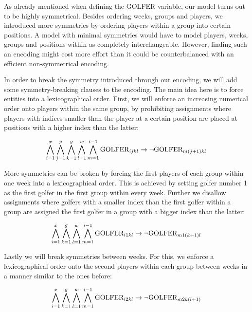 \documentclass[a4paper]{scrartcl}
\begin{document}
As already mentioned when defining the GOLFER variable, our model turns out to be highly symmetrical. Besides ordering weeks, groups and players, we introduced more symmetries by ordering players within a group into certain positions. A model with minimal symmetries would have to model players, weeks, groups and positions within as completely interchangeable. However, finding such an encoding might cost more effort than it could be counterbalanced with an efficient non-symmetrical encoding. 

In order to break the symmetry introduced through our encoding, we will add some symmetry-breaking clauses to the encoding. The main idea here is to force entities into a lexicographical order. First, we will enforce an increasing numerical order onto players within the same group, by prohibiting assignments where players with indices smaller than the player at a certain position are placed at positions with a higher index than the latter:

\begin{equation}
\centering
    \bigwedge \limits_{i=1}^x
    \bigwedge \limits_{j=1}^p
    \bigwedge \limits_{k=1}^g
    \bigwedge \limits_{l=1}^w
    \bigwedge \limits_{m=1}^{i-1}
    \text{GOLFER}_{ijkl}
    \to
    \neg \text{GOLFER}_{m(j+1)kl}
\end{equation}

More symmetries can be broken by forcing the first players of each group within one week into a lexicographical order. This is achieved by setting golfer number 1 as the first golfer in the first group within every week. Further we disallow assignments where golfers with a smaller index than the first golfer within a group are assigned the first golfer in a group with a bigger index than the latter:

\begin{equation}
\centering
    \bigwedge \limits_{i=1}^x
    \bigwedge \limits_{k=1}^g
    \bigwedge \limits_{l=1}^w
    \bigwedge \limits_{m=1}^{i-1}
    \text{GOLFER}_{i1kl}
    \to
    \neg \text{GOLFER}_{m1(k+1)l}
\end{equation}

Lastly we will break symmetries between weeks. For this, we enforce a lexicographical order onto the second players within each group between weeks in a manner similar to the ones before:

\begin{equation}
\centering
    \bigwedge \limits_{i=1}^x
    \bigwedge \limits_{k=1}^g
    \bigwedge \limits_{l=1}^w
    \bigwedge \limits_{m=1}^{i-1}
    \text{GOLFER}_{i2kl}
    \to
    \neg \text{GOLFER}_{m2k(l+1)}
\end{equation}
\end{document}
